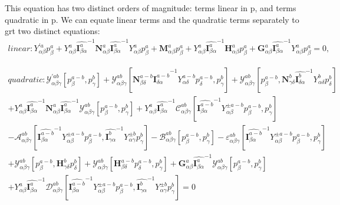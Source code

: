 \documentclass{Note}
\begin{document}
This equation has two distinct orders of magnitude: terms linear in p, and terms quadratic in p. We can equate linear terms and the quadratic terms separately to grt two distinct equations:
 \begin{equation}
\begin{aligned}
linear:{Y}_{\alpha\beta}^{'a} p_{\beta}^a+Y_{\alpha\beta}^{a} {\widehat{\textbf{I}_{\beta \alpha}^a}}^{-1}   \textbf{N}_{\alpha\beta}^a {\widehat{\textbf{I}_{\beta \alpha}^a}}^{-1}  Y_{\alpha\beta}^a p_\beta^a+\textbf{M}_{\alpha\beta}^a p_\beta^a+Y_{\alpha\beta}^{a} {\widehat{\textbf{I}_{\beta \alpha}^a}}^{-1}  \textbf{H}_{\alpha\beta}^a p_\beta^a+ \textbf{G}_{\alpha\beta}^a  {\widehat{\textbf{I}_{\beta \alpha}^a}}^{-1}  Y_{\alpha\beta}^a p_\beta^a=0,
\end{aligned}
\end{equation}


\begin{equation}
\begin{aligned}
quadratic:\mathcal{Y}_{\alpha\beta\gamma}^{'ab}[p_{\beta}^{a-b},p_{\gamma}^{b}]+\mathcal{Y}_{\alpha\beta\gamma}^{ab}[\textbf{N}_{\beta\delta}^{a-b} {\widehat{\textbf{I}_{\delta \alpha}^{a-b}}}^{-1}  Y_{\alpha\delta}^{a-b} p_\delta^{a-b} ,p_{\gamma}^{b}]+\mathcal{Y}_{\alpha\beta\gamma}^{ab}[p_\beta^{a-b},\textbf{N}_{\gamma\delta}^{b} {\widehat{\textbf{I}_{\delta \alpha}^{b}}}^{-1}  Y_{\alpha\delta}^{b} p_\delta^{b} ]\\
+Y_{\alpha\beta}^{a} {\widehat{\textbf{I}_{\beta \alpha}^a}}^{-1}   \textbf{N}_{\alpha\beta}^a {\widehat{\textbf{I}_{\beta \alpha}^a}}^{-1} \mathcal{Y}_{\alpha\beta\gamma}^{ab}[p_{\beta}^{a-b},p_{\gamma}^{b}] +Y_{\alpha\beta}^{a}{\widehat{\textbf{I}_{\beta \alpha}^a}}^{-1}  \mathcal{C}_{\alpha\beta\gamma}^{ab}[{\widehat{\textbf{I}_{\beta \alpha}^{a-b}}}^{-1}  Y_{\alpha\beta}^{\pm a-b} p_\beta^{a-b} ,p_{\gamma}^{b}]\\
-\mathcal{A}_{\alpha\beta\gamma}^{ab}[{\widehat{\textbf{I}_{\beta \alpha}^{a-b}}}^{-1}  Y_{\alpha\beta}^{\pm a-b} p_\beta^{a-b},{\widehat{\textbf{I}_{\gamma \alpha}^{b}}}^{-1}  Y_{\alpha\gamma}^{\pm b} p_\gamma^{b}]-\mathcal{B}_{\alpha\beta\gamma}^{ab}[p_{\beta}^{a-b},p_{\gamma}^{b}]-\varepsilon_{\alpha\beta\gamma}^{ab}[{\widehat{\textbf{I}_{\beta \alpha}^{a-b}}}^{-1}  Y_{\alpha\beta}^{\pm a-b} p_\beta^{a-b} ,p_{\gamma}^{b}]\\
+\mathcal{Y}_{\alpha\beta\gamma}^{ab}[p_\beta^{a-b},\textbf{H}_{\gamma\delta}^{b} p_{\delta}^{b}]+\mathcal{Y}_{\alpha\beta\gamma}^{ab}[\textbf{H}_{\beta\delta}^{a-b} p_{\delta}^{a-b},p_{\gamma}^{b} ]+\textbf{G}_{\alpha\beta}^a  {\widehat{\textbf{I}_{\beta \alpha}^a}}^{-1} \mathcal{Y}_{\alpha\beta\gamma}^{ab}[p_{\beta}^{a-b},p_{\gamma}^{b}] \\
+Y_{\alpha\beta}^{a} {\widehat{\textbf{I}_{\beta \alpha}^a}}^{-1}  \mathcal{D}_{\alpha\beta\gamma}^{ab}[{\widehat{\textbf{I}_{\beta \alpha}^{a-b}}}^{-1}  Y_{\alpha\beta}^{\pm a-b} p_\beta^{a-b},{\widehat{\textbf{I}_{\gamma \alpha}^{b}}}^{-1}  Y_{\alpha\gamma}^{\pm b} p_\gamma^{b}]=0
\end{aligned}
\end{equation}
\end{document}

